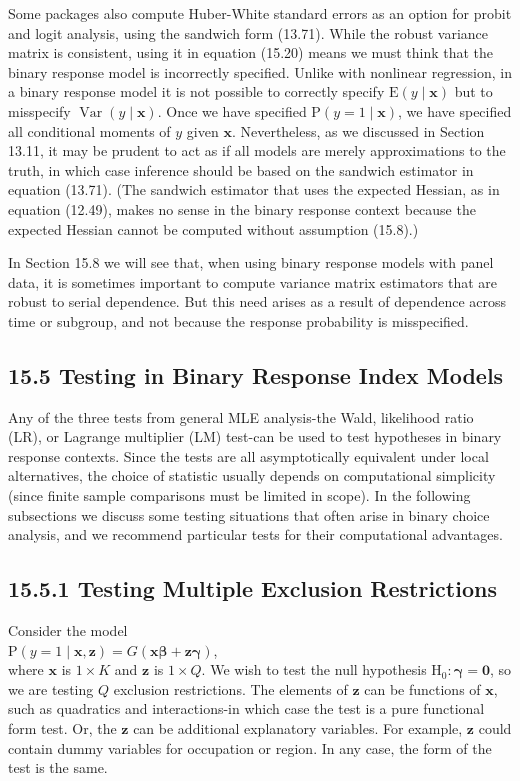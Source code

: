 \documentclass[10pt]{article}
\begin{document}
Some packages also compute Huber-White standard errors as an option for probit and logit analysis, using the sandwich form (13.71). While the robust variance matrix is consistent, using it in equation (15.20) means we must think that the binary response model is incorrectly specified. Unlike with nonlinear regression, in a binary response model it is not possible to correctly specify $\mathrm{E}(y \mid \mathbf{x})$ but to misspecify $\operatorname{Var}(y \mid \mathbf{x})$. Once we have specified $\mathrm{P}(y=1 \mid \mathbf{x})$, we have specified all conditional moments of $y$ given $\mathbf{x}$. Nevertheless, as we discussed in Section 13.11, it may be prudent to act as if all models are merely approximations to the truth, in which case inference should be based on the sandwich estimator in equation (13.71). (The sandwich estimator that uses the expected Hessian, as in equation (12.49), makes no sense in the binary response context because the expected Hessian cannot be computed without assumption (15.8).)

In Section 15.8 we will see that, when using binary response models with panel data, it is sometimes important to compute variance matrix estimators that are robust to serial dependence. But this need arises as a result of dependence across time or subgroup, and not because the response probability is misspecified.

\subsection*{15.5 Testing in Binary Response Index Models}
Any of the three tests from general MLE analysis-the Wald, likelihood ratio (LR), or Lagrange multiplier (LM) test-can be used to test hypotheses in binary response contexts. Since the tests are all asymptotically equivalent under local alternatives, the choice of statistic usually depends on computational simplicity (since finite sample comparisons must be limited in scope). In the following subsections we discuss some testing situations that often arise in binary choice analysis, and we recommend particular tests for their computational advantages.

\subsection*{15.5.1 Testing Multiple Exclusion Restrictions}
Consider the model\\
$\mathrm{P}(y=1 \mid \mathbf{x}, \mathbf{z})=G(\mathbf{x} \boldsymbol{\beta}+\mathbf{z} \boldsymbol{\gamma})$,\\
where $\mathbf{x}$ is $1 \times K$ and $\mathbf{z}$ is $1 \times Q$. We wish to test the null hypothesis $\mathrm{H}_{0}: \boldsymbol{\gamma}=\mathbf{0}$, so we are testing $Q$ exclusion restrictions. The elements of $\mathbf{z}$ can be functions of $\mathbf{x}$, such as quadratics and interactions-in which case the test is a pure functional form test. Or, the $\mathbf{z}$ can be additional explanatory variables. For example, $\mathbf{z}$ could contain dummy variables for occupation or region. In any case, the form of the test is the same.
\end{document}
